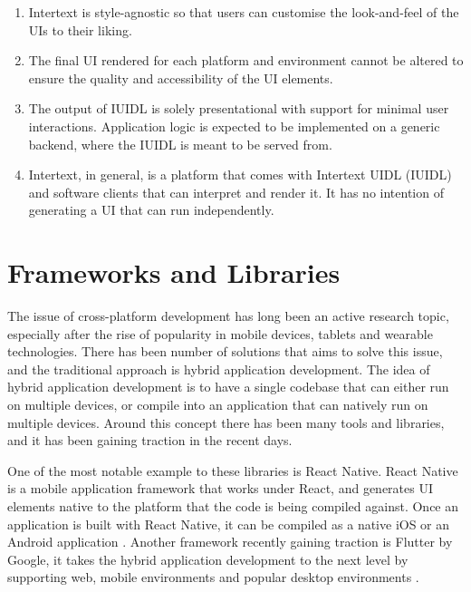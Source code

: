 \begin{enumerate}
  \item Intertext is style-agnostic so that users can customise the look-and-feel of the UIs to their liking.
  
  \item The final UI rendered for each platform and environment cannot be altered to ensure the quality and accessibility of the UI elements.
  
  \item The output of IUIDL is solely presentational with support for minimal user interactions. Application logic is expected to be implemented on a generic backend, where the IUIDL is meant to be served from.

  \item Intertext, in general, is a platform that comes with Intertext UIDL (IUIDL) and software clients that can interpret and render it. It has no intention of generating a UI that can run independently.
\end{enumerate}

\section{Frameworks and Libraries} \label{relatedTools}

The issue of cross-platform development has long been an active research topic, especially after the rise of popularity in mobile devices, tablets and wearable technologies. There has been number of solutions that aims to solve this issue, and the traditional approach is hybrid application development. The idea of hybrid application development is to have a single codebase that can either run on multiple devices, or compile into an application that can natively run on multiple devices. Around this concept there has been many tools and libraries, and it has been gaining traction in the recent days.

One of the most notable example to these libraries is React Native. React Native is a mobile application framework that works under React, and generates UI elements native to the platform that the code is being compiled against. Once an application is built with React Native, it can be compiled as a native iOS or an Android application \cite{ReactNative}. Another framework recently gaining traction is Flutter by Google, it takes the hybrid application development to the next level by supporting web, mobile environments and popular desktop environments \cite{Flutter}.


